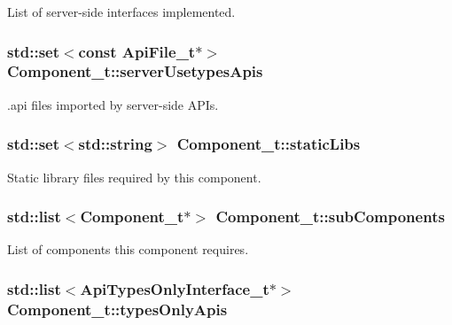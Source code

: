 List of server-\/side interfaces implemented. 

\subsubsection[{\texorpdfstring{server\+Usetypes\+Apis}{serverUsetypesApis}}]{\setlength{\rightskip}{0pt plus 5cm}std\+::set$<$const {\bf Api\+File\+\_\+t}$\ast$$>$ Component\+\_\+t\+::server\+Usetypes\+Apis}\hypertarget{struct_component__t_ac619f06cbbc043ba217d2270a6a04a1e}{}\label{struct_component__t_ac619f06cbbc043ba217d2270a6a04a1e}


.api files imported by server-\/side A\+P\+Is. 

\subsubsection[{\texorpdfstring{static\+Libs}{staticLibs}}]{\setlength{\rightskip}{0pt plus 5cm}std\+::set$<$std\+::string$>$ Component\+\_\+t\+::static\+Libs}\hypertarget{struct_component__t_a661917642d4fe62c1b3b22718346e365}{}\label{struct_component__t_a661917642d4fe62c1b3b22718346e365}


Static library files required by this component. 

\subsubsection[{\texorpdfstring{sub\+Components}{subComponents}}]{\setlength{\rightskip}{0pt plus 5cm}std\+::list$<${\bf Component\+\_\+t}$\ast$$>$ Component\+\_\+t\+::sub\+Components}\hypertarget{struct_component__t_a93b979c7bee7a4186d6fe5bca3238fe1}{}\label{struct_component__t_a93b979c7bee7a4186d6fe5bca3238fe1}


List of components this component requires. 

\subsubsection[{\texorpdfstring{types\+Only\+Apis}{typesOnlyApis}}]{\setlength{\rightskip}{0pt plus 5cm}std\+::list$<${\bf Api\+Types\+Only\+Interface\+\_\+t}$\ast$$>$ Component\+\_\+t\+::types\+Only\+Apis}\hypertarget{struct_component__t_a355066d33c088408bd720bf404609798}{}\label{struct_component__t_a355066d33c088408bd720bf404609798}


